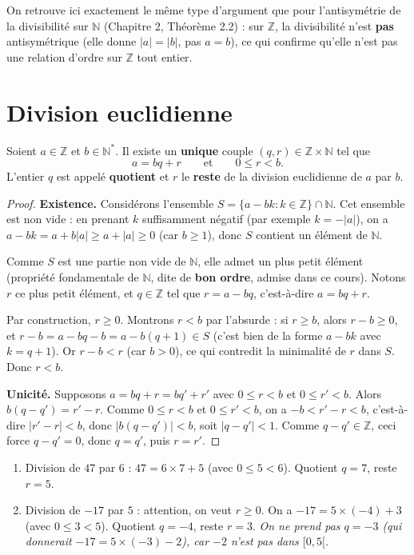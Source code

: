 \documentclass[a4paper,12pt,openany]{book}
\begin{document}
\begin{remarque}
On retrouve ici exactement le même type d'argument que pour l'antisymétrie
de la divisibilité sur $\mathbb{N}$ (Chapitre 2, Théorème 2.2) : sur
$\mathbb{Z}$, la divisibilité n'est \textbf{pas} antisymétrique
(elle donne $|a|=|b|$, pas $a=b$), ce qui confirme qu'elle n'est pas une
relation d'ordre sur $\mathbb{Z}$ tout entier.
\end{remarque}

\section{Division euclidienne}


\begin{theoreme}
Soient $a\in\mathbb{Z}$ et $b\in\mathbb{N}^*$. Il existe un \textbf{unique}
couple $(q,r)\in\mathbb{Z}\times\mathbb{N}$ tel que
\[
a = bq+r \qquad \text{et} \qquad 0\leq r < b.
\]
L'entier $q$ est appelé \textbf{quotient} et $r$ le \textbf{reste} de la
division euclidienne de $a$ par $b$.
\end{theoreme}

\begin{proof}
\textbf{Existence.} Considérons l'ensemble
$S = \{a-bk : k\in\mathbb{Z}\} \cap \mathbb{N}$. Cet ensemble est non
vide : en prenant $k$ suffisamment négatif (par exemple
$k=-|a|$), on a $a-bk = a+b|a| \geq a + |a| \geq 0$ (car $b\geq1$), donc
$S$ contient un élément de $\mathbb{N}$.

Comme $S$ est une partie non vide de $\mathbb{N}$, elle admet un plus
petit élément (propriété fondamentale de $\mathbb{N}$, dite de
\textbf{bon ordre}, admise dans ce cours). Notons $r$ ce plus petit
élément, et $q\in\mathbb{Z}$ tel que $r=a-bq$, c'est-à-dire $a=bq+r$.

Par construction, $r\geq0$. Montrons $r<b$ par l'absurde : si $r\geq b$,
alors $r-b\geq0$, et $r-b = a-bq-b = a-b(q+1) \in S$ (c'est bien de la
forme $a-bk$ avec $k=q+1$). Or $r-b<r$ (car $b>0$), ce qui contredit la
minimalité de $r$ dans $S$. Donc $r<b$.

\textbf{Unicité.} Supposons $a=bq+r=bq'+r'$ avec $0\leq r<b$ et
$0\leq r'<b$. Alors $b(q-q') = r'-r$. Comme $0\leq r<b$ et $0\leq r'<b$,
on a $-b < r'-r < b$, c'est-à-dire $|r'-r|<b$, donc $|b(q-q')|<b$, soit
$|q-q'|<1$. Comme $q-q'\in\mathbb{Z}$, ceci force $q-q'=0$, donc $q=q'$,
puis $r=r'$.
\end{proof}


\begin{exemple}[5.1]
\begin{enumerate}
  \item Division de $47$ par $6$ : $47 = 6\times7+5$ (avec $0\leq5<6$).
  Quotient $q=7$, reste $r=5$.
  \item Division de $-17$ par $5$ : attention, on veut $r\geq0$. On a
  $-17 = 5\times(-4)+3$ (avec $0\leq3<5$). Quotient $q=-4$, reste $r=3$.
  \emph{On ne prend pas $q=-3$ (qui donnerait $-17=5\times(-3)-2$), car
  $-2$ n'est pas dans $[0,5[$.}
\end{enumerate}
\end{exemple}
\end{document}
